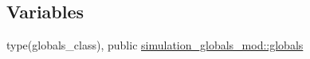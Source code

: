 \subsection*{Variables}
\begin{DoxyCompactItemize}
\item 
type(globals\+\_\+class), public \hyperlink{namespacesimulation__globals__mod_a04123075b6de525703edb89697fc39e9}{simulation\+\_\+globals\+\_\+mod\+::globals}
\end{DoxyCompactItemize}
